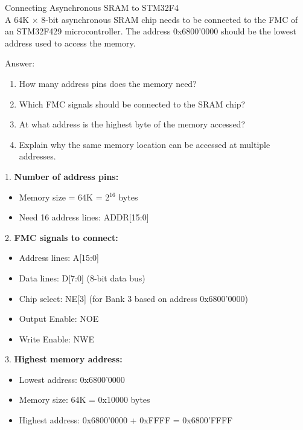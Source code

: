 \begin{example2}{Connecting Asynchronous SRAM to STM32F4}\\
A 64K × 8-bit asynchronous SRAM chip needs to be connected to the FMC of an STM32F429 microcontroller. The address 0x6800'0000 should be the lowest address used to access the memory.

Answer:
\begin{enumerate}
    \item How many address pins does the memory need?
    \item Which FMC signals should be connected to the SRAM chip?
    \item At what address is the highest byte of the memory accessed?
    \item Explain why the same memory location can be accessed at multiple addresses.
\end{enumerate}

\tcblower

1. \textbf{Number of address pins:}
   \begin{itemize}
     \item Memory size = 64K = 2$^{16}$ bytes
     \item Need 16 address lines: ADDR[15:0]
   \end{itemize}

2. \textbf{FMC signals to connect:}
   \begin{itemize}
     \item Address lines: A[15:0]
     \item Data lines: D[7:0] (8-bit data bus)
     \item Chip select: NE[3] (for Bank 3 based on address 0x6800'0000)
     \item Output Enable: NOE
     \item Write Enable: NWE
   \end{itemize}

3. \textbf{Highest memory address:}
   \begin{itemize}
     \item Lowest address: 0x6800'0000
     \item Memory size: 64K = 0x10000 bytes
     \item Highest address: 0x6800'0000 + 0xFFFF = 0x6800'FFFF
   \end{itemize}


\end{example2}
